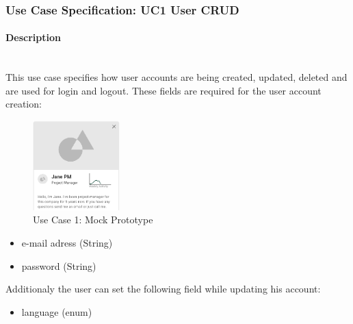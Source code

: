 
\newpage
\subsubsection{Use Case Specification: \ac{UC}1 User CRUD}
\label{sec:domainBbb}

\paragraph*{Description}\mbox{}\\
This use case specifies how user accounts are being created, updated, deleted and are used for login and logout.
These fields are required for the user account creation:

\begin{figure}
	\includegraphics[width=0.3\textwidth,right]{Assets/UC_Screenshots/UC1S.png}
	\caption{Use Case 1: Mock Prototype}
	\label{fig:useCase1Detail}
\end{figure}

\begin{itemize}
	\vspace{-3mm}
	\setlength\itemsep{-1em}
	\item e-mail adress (String)
	\item password (String)
\end{itemize}
Additionaly the user can set the following field while updating his account:
\begin{itemize}
	\vspace{-3mm}
	\setlength\itemsep{-1em}
	\item language (enum)
\end{itemize}


